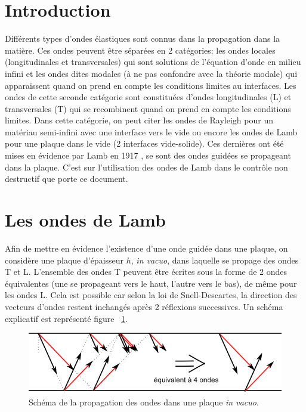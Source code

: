 \documentclass[twoside]{article}
\begin{document}
\begin{multicols}{2} %

\section{Introduction}
Différents types d'ondes élastiques sont connus dans la propagation dans la matière. Ces ondes peuvent être séparées en 2 catégories: les ondes locales (longitudinales et transversales) qui sont solutions de l'équation d'onde en milieu infini et les ondes dites modales (à ne pas confondre avec la théorie modale) qui apparaissent quand on prend en compte les conditions limites au interfaces. Les ondes de cette seconde catégorie sont constituées d'ondes longitudinales (L) et transversales (T) qui se recombinent quand on prend en compte les conditions limites.  Dans cette  catégorie, on peut citer les ondes de Rayleigh pour un matériau semi-infini avec une interface vers le vide ou encore les ondes de Lamb pour une plaque dans le vide (2 interfaces vide-solide). Ces dernières ont été mises en évidence par Lamb en 1917 \cite{Lamb}, se sont des ondes guidées se propageant dans la plaque.
C'est sur l'utilisation des ondes de Lamb dans le contrôle non destructif que porte ce document.

\section{Les ondes de Lamb}
Afin de mettre en évidence l’existence d'une onde guidée dans une plaque, on considère une plaque d'épaisseur $h$, \emph{in vacuo}, dans laquelle se propage des ondes T et L. L'ensemble des ondes T peuvent être écrites sous la forme de 2 ondes équivalentes (une se propageant vers le haut, l'autre vers le bas), de même pour les ondes L. Cela est possible car selon la loi de Snell-Descartes, la direction des vecteurs d'ondes restent inchangés après 2 réflexions successives. Un schéma explicatif est représenté figure ~\ref{fig1}.


\begin{figure}[H]
\centering
\includegraphics[scale=0.5]{./images/lamb_expli.png}
\caption{\label{fig1} Schéma de la propagation des ondes dans une plaque \emph{in vacuo}.}
\end{figure}


\end{multicols}
\end{document}
